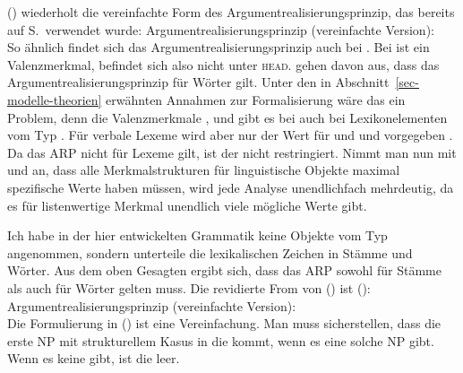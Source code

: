 {\noindent
() wiederholt die vereinfachte Form des Argumentrealisierungsprinzip, das bereits auf
S.\,\pageref{Prinzip-Argumentrealisierung-einfach-SUBJ} verwendet wurde:
\ea
\label{Prinzip-Argumentrealisierung-einfach-SUBJ-zwei}%
Argumentrealisierungsprinzip (vereinfachte Version):\\[2pt]
 \impl
{}
\z
So ähnlich findet sich das Argumentrealisierungsprinzip auch bei \citet[23]{GSag2000a-u}. Bei
\citeauthor{GSag2000a-u} ist \subj ein Valenzmerkmal, befindet sich also nicht unter
\textsc{head}. \citeauthor{GSag2000a-u} gehen davon aus, dass das Argumentrealisierungsprinzip für
Wörter gilt. Unter den in Abschnitt~\ref{sec-modelle-theorien} erwähnten Annahmen zur Formalisierung wäre das ein Problem,
denn die Valenzmerkmale \subj, \spr und \comps gibt es bei \citet[361]{GSag2000a-u} auch bei
Lexikonelementen vom Typ . Für verbale Lexeme wird aber nur der Wert für \argst und \subj und \spr
vorgegeben \citep[22]{GSag2000a-u}. Da das ARP nicht für Lexeme gilt, ist der \compsw nicht restringiert. Nimmt man nun mit
\citet[17--18]{ps2} und \citet{Richter2021a} an, dass alle Merkmalstrukturen für linguistische Objekte
maximal spezifische Werte haben müssen, wird jede Analyse unendlichfach mehrdeutig, da es für
listenwertige Merkmal unendlich viele mögliche Werte gibt. 

Ich habe in der hier entwickelten Grammatik keine Objekte vom Typ  angenommen, sondern
unterteile die lexikalischen Zeichen in Stämme und Wörter. Aus dem oben Gesagten ergibt sich, dass
das ARP sowohl für Stämme als auch für Wörter gelten muss. Die revidierte From von () ist
():
\ea
\label{Prinzip-Argumentrealisierung-einfach-SUBJ-lexical-sign}%
Argumentrealisierungsprinzip (vereinfachte Version):\\
 \impl
{}
\z
Die Formulierung in () ist eine Vereinfachung. Man muss sicherstellen, dass die erste NP mit
strukturellem Kasus in die \subjl kommt, wenn es eine solche NP gibt. Wenn es keine gibt, ist die
\subjl leer. 

}
